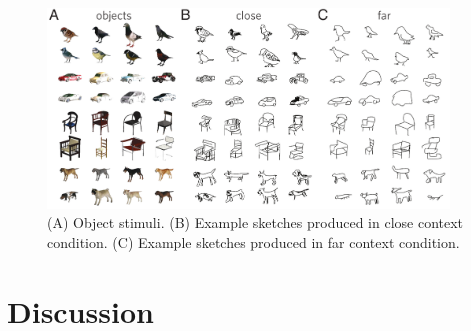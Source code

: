 \documentclass[9pt,twocolumn,twoside]{pnas-new}
\begin{document}

\begin{figure}[htbp]
\centering
\includegraphics[width=0.95\textwidth]{figures/2_sketch_gallery-min.pdf}
\caption{(A) Object stimuli. (B) Example sketches produced in close context condition. (C) Example sketches produced in far context condition.}
\label{sketch_gallery}
\end{figure}


\section*{Discussion}
\end{document}
